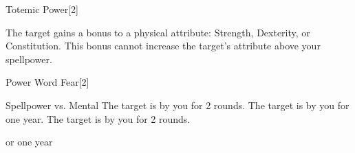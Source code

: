 \begin{spellfooter}
\begin{spellsection}{Totemic Power}[2]
    \begin{spellheader}
    \end{spellheader}
    \begin{spellcontent}
        \begin{spelltargetinginfo}
        \end{spelltargetinginfo}
        \begin{spelleffects}
            \spelleffect The target gains a  bonus to a physical attribute: Strength, Dexterity, or Constitution. This bonus cannot increase the target's attribute above your spellpower.
            \spelldur \durpersonallong
        \end{spelleffects}
    \end{spellcontent}
    \begin{spellfooter}
    \end{spellfooter}
    \begin{spellaugments}
    \end{spellaugments}
\end{spellsection}

\begin{spellsection}{Power Word Fear}[2]
    \begin{spellheader}
    \end{spellheader}
    \begin{spellcontent}
        \begin{spelltargetinginfo}
        \end{spelltargetinginfo}
        \begin{spelleffects}
            \begin{spellattack}{Spellpower vs. Mental}
                \spellsuccess The target is \frightened by you for 2 rounds.
                \spellcritical The target is \frightened by you for one year.
                \spellfailure The target is \shaken by you for 2 rounds.
            \end{spellattack}
            \spelldur \durbrief or one year
        \end{spelleffects}
    \end{spellcontent}
    \begin{spellfooter}
        \miscastrandom
    \end{spellfooter}
\end{spellsection}


\end{spellfooter}
